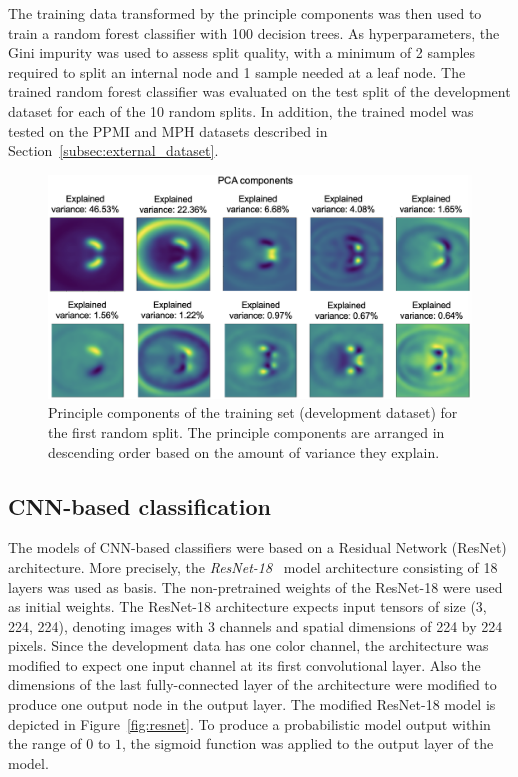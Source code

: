 The training data transformed by the principle components was then used to train a random forest classifier with 100 decision trees.
As hyperparameters, the Gini impurity was used to assess split quality, 
with a minimum of 2 samples required to split an internal node and 1 sample needed at a leaf node.
The trained random forest classifier was evaluated on the test split of the development dataset for each of the 10 random splits.
In addition, the trained model was tested on the PPMI and MPH datasets described in Section~\ref{subsec:external_dataset}.

\begin{figure}[ht]
  \centering
  \includegraphics[width=1.0\textwidth]{content/figures/pca_components_splittrain_enhanced.png}
  \caption{Principle components of the training set (development dataset) for the first random split.
  The principle components are arranged in descending order based on the amount of variance they explain.} 
  \label{fig:pca_components}
\end{figure} 

\subsection{CNN-based classification}
\label{subsec:cnn_based_classification}

The models of CNN-based classifiers were based on a Residual Network (ResNet) architecture.
More precisely, the \textit{ResNet-18}~\citep{resnet2015} model architecture consisting of 18 layers was used as basis.
The non-pretrained weights of the ResNet-18 were used as initial weights.
The ResNet-18 architecture expects input tensors of size (3, 224, 224), 
denoting images with 3 channels and spatial dimensions of 224 by 224 pixels.
Since the development data has one color channel, the architecture was modified to expect one input channel at its 
first convolutional layer.
Also the dimensions of the last fully-connected layer of the architecture were modified to produce one output node 
in the output layer.
The modified ResNet-18 model is depicted in Figure~\ref{fig:resnet}.
To produce a probabilistic model output within the range of $0$ to $1$, 
the sigmoid function was applied to the output layer of the model.

